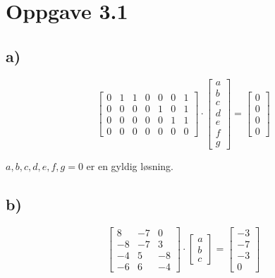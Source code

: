 \section{Oppgave 3.1}

\subsection*{a)}

\[
\left[
\begin{array}{ccccccc}
    0&1&1&0&0&0&1 \\
    0&0&0&0&1&0&1 \\
    0&0&0&0&0&1&1 \\
    0&0&0&0&0&0&0
\end{array}
\right] \cdot
\left[
\begin{array}{c}
    a  \\
    b  \\
    c  \\
    d  \\
    e  \\
    f  \\
    g
\end{array}
\right] =
\left[
\begin{array}{c}
    0  \\
    0  \\
    0  \\
    0 
\end{array}
\right]
\]

\(
a, b, c, d, e, f, g = 0
\) er en gyldig løsning.

\subsection*{b)}

\[
    \left[
        \begin{array}{ccc}
            8&-7&0\\
            -8&-7&3\\
            -4&5&-8\\
            -6&6&-4
        \end{array}
    \right] \cdot
    \left[
        \begin{array}{c}
            a\\
            b\\
            c
        \end{array}
    \right] =
    \left[
        \begin{array}{c}
            -3\\
            -7\\
            -3\\
            0
        \end{array}
    \right]
\]

